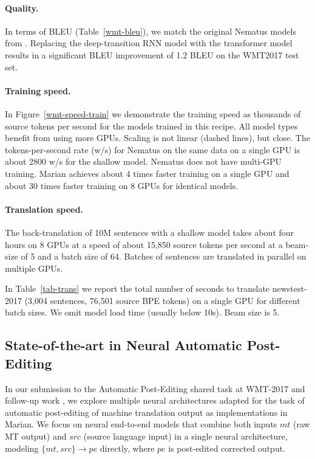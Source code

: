 \documentclass[11pt,a4paper]{article}
\begin{document}
\paragraph{Quality.} In terms of BLEU (Table~\ref{wmt-bleu}), we match  the original Nematus models from . 
Replacing the deep-transition RNN model with the transformer model results in a significant BLEU improvement of 1.2 BLEU on the WMT2017 test set. 

\paragraph{Training speed.}

In Figure~\ref{wmt-speed-train} we demonstrate the training speed as thousands of source tokens per second for the models trained in this recipe. All model types benefit from using more GPUs. Scaling is not linear (dashed lines), but close. The tokens-per-second rate (w/s) for Nematus on the same data on a single GPU is about 2800 w/s for the shallow model. Nematus does not have multi-GPU training. Marian achieves about 4 times faster training on a single GPU and about 30 times faster training on 8 GPUs for identical models.

\paragraph{Translation speed.}

The back-translation of 10M sentences with a shallow model takes about four hours on 8 GPUs at a speed of about 15,850 source tokens per second at a beam-size of 5 and a batch size of 64. Batches of sentences are translated in parallel on multiple GPUs. 

In Table~\ref{tab-trans} we report the total number of seconds to translate newstest-2017 (3,004 sentences, 76,501 source BPE tokens) on a single GPU for different batch sizes. We omit model load time (usually below 10s). Beam size is 5.


\subsection{State-of-the-art in Neural Automatic Post-Editing}
In our submission to the Automatic Post-Editing shared task at WMT-2017 \cite{bojar-EtAl:2017:WMT1} and follow-up work \cite{junczysdowmunt-grundkiewicz:2017:WMT, I17-1013}, 
we explore multiple neural architectures adapted for the task of automatic post-editing of machine translation output as implementations in Marian. We focus on neural end-to-end models that combine both inputs $mt$ (raw MT output) and $src$ (source language input) in a single neural architecture, modeling $\{mt,src\}\rightarrow pe$ directly, where $pe$ is post-edited corrected output.
\end{document}
